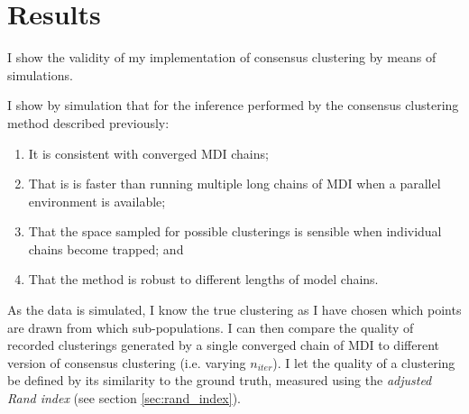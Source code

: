 \documentclass[12pt]{article} %
\begin{document}
	

	
	\section{Results}
	I show the validity of my implementation of consensus clustering by means of simulations. 
	
	I show by simulation that for the inference performed by the consensus clustering method described previously:
	\begin{enumerate}
		\item It is consistent with converged MDI chains;
		\item That is is faster than running multiple long chains of MDI when a parallel environment is available;
		\item That the space sampled for possible clusterings is sensible when individual chains become trapped; and
		\item That the method is robust to different lengths of model chains.
	\end{enumerate}
	As the data is simulated, I know the true clustering as I have chosen which points are drawn from which sub-populations. I can then compare the quality of recorded clusterings generated by a single converged chain of MDI to different version of consensus clustering (i.e. varying $n_{iter}$). I let the quality of a clustering be defined by its similarity to the ground truth, measured using the \emph{adjusted Rand index} (see section \ref{sec:rand_index}).
	
\end{document}
